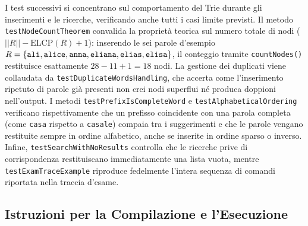 \documentclass[11pt,a4paper]{article}
\begin{document}
I test successivi si concentrano sul comportamento del Trie durante gli inserimenti e le ricerche, verificando anche tutti i casi limite previsti. Il metodo \texttt{testNodeCountTheorem} convalida la proprietà teorica sul numero totale di nodi ($||R|| - \text{ELCP}(R) + 1$): inserendo le sei parole d'esempio $R = \{\text{\texttt{ali}}, \text{\texttt{alice}}, \text{\texttt{anna}}, \text{\texttt{eliana}}, \text{\texttt{elias}}, \text{\texttt{elisa}}\}$, il conteggio tramite \texttt{countNodes()} restituisce esattamente $28 - 11 + 1 = 18$ nodi. La gestione dei duplicati viene collaudata da \texttt{testDuplicateWordsHandling}, che accerta come l'inserimento ripetuto di parole già presenti non crei nodi superflui né produca doppioni nell'output. I metodi \texttt{testPrefixIsCompleteWord} e \texttt{testAlphabeticalOrdering} verificano rispettivamente che un prefisso coincidente con una parola completa (come \texttt{casa} rispetto a \texttt{casale}) compaia tra i suggerimenti e che le parole vengano restituite sempre in ordine alfabetico, anche se inserite in ordine sparso o inverso. Infine, \texttt{testSearchWithNoResults} controlla che le ricerche prive di corrispondenza restituiscano immediatamente una lista vuota, mentre \texttt{testExamTraceExample} riproduce fedelmente l'intera sequenza di comandi riportata nella traccia d'esame.

\subsection{Istruzioni per la Compilazione e l'Esecuzione}
\end{document}

